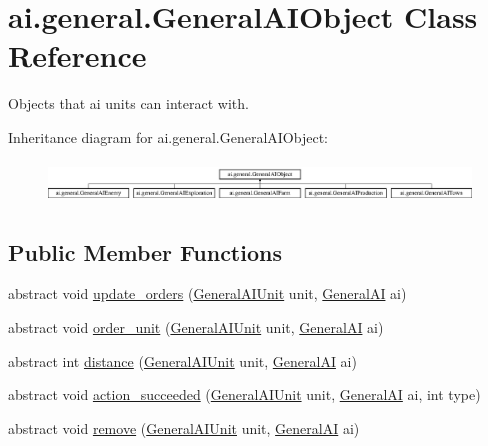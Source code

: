 \hypertarget{classai_1_1general_1_1_general_a_i_object}{
\section{ai.general.GeneralAIObject Class Reference}
\label{classai_1_1general_1_1_general_a_i_object}
}


Objects that ai units can interact with.  


Inheritance diagram for ai.general.GeneralAIObject:\begin{figure}[H]
\begin{center}
\leavevmode
\includegraphics[height=1.114428cm]{classai_1_1general_1_1_general_a_i_object}
\end{center}
\end{figure}
\subsection*{Public Member Functions}
\begin{DoxyCompactItemize}
\item 
abstract void \hyperlink{classai_1_1general_1_1_general_a_i_object_adcb52382eaf3447f61640f6aca6225f6}{update\_\-orders} (\hyperlink{classai_1_1general_1_1_general_a_i_unit}{GeneralAIUnit} unit, \hyperlink{classai_1_1general_1_1_general_a_i}{GeneralAI} ai)
\item 
abstract void \hyperlink{classai_1_1general_1_1_general_a_i_object_a44472c53ca6f1b73a703de0e82e71701}{order\_\-unit} (\hyperlink{classai_1_1general_1_1_general_a_i_unit}{GeneralAIUnit} unit, \hyperlink{classai_1_1general_1_1_general_a_i}{GeneralAI} ai)
\item 
abstract int \hyperlink{classai_1_1general_1_1_general_a_i_object_af0a1ecd68f29b47e6f2cfe1b97f00db2}{distance} (\hyperlink{classai_1_1general_1_1_general_a_i_unit}{GeneralAIUnit} unit, \hyperlink{classai_1_1general_1_1_general_a_i}{GeneralAI} ai)
\item 
abstract void \hyperlink{classai_1_1general_1_1_general_a_i_object_ad5e0562b19a63a8894a45ef7ad28ba35}{action\_\-succeeded} (\hyperlink{classai_1_1general_1_1_general_a_i_unit}{GeneralAIUnit} unit, \hyperlink{classai_1_1general_1_1_general_a_i}{GeneralAI} ai, int type)
\item 
abstract void \hyperlink{classai_1_1general_1_1_general_a_i_object_abe548d19bcc8b0022632c78bc2efda2f}{remove} (\hyperlink{classai_1_1general_1_1_general_a_i_unit}{GeneralAIUnit} unit, \hyperlink{classai_1_1general_1_1_general_a_i}{GeneralAI} ai)
\end{DoxyCompactItemize}


